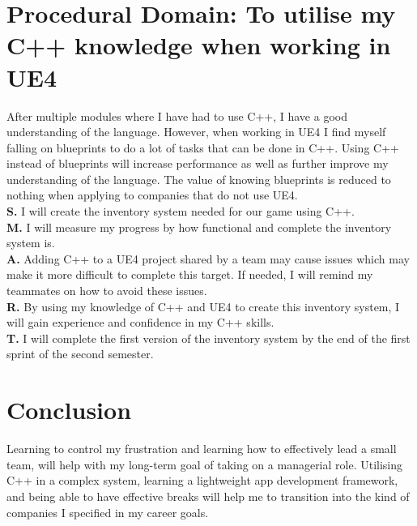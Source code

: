 \documentclass{scrartcl}
\begin{document}
\section{Procedural Domain: To utilise my C++ knowledge when working in UE4}
After multiple modules where I have had to use C++, I have a good understanding of the language.  However, when working in UE4 I find myself falling on blueprints to do a lot of tasks that can be done in C++. Using C++ instead of blueprints will increase performance as well as further improve my understanding of the language. The value of knowing blueprints is reduced to nothing when applying to companies that do not use UE4.\\
\textbf{S.} I will create the inventory system needed for our game using C++. \\
\textbf{M.} I will measure my progress by how functional and complete the inventory system is.\\
\textbf{A.} Adding C++ to a UE4 project shared by a team may cause issues which may make it more difficult to complete this target. If needed, I will remind my teammates on how to avoid these issues. \\
\textbf{R.}  By using my knowledge of C++ and UE4 to create this inventory system, I will gain experience and confidence in my C++ skills.\\
\textbf{T.}  I will complete the first version of the inventory system by the end of the first sprint of the second semester.\\

\section{Conclusion}
Learning to control my frustration and learning how to effectively lead a small team, will help with my long-term goal of taking on a managerial role. Utilising C++ in a complex system,  learning a lightweight app development framework, and being able to have effective breaks will help me to transition into the kind of companies I specified in my career goals.



\end{document}

